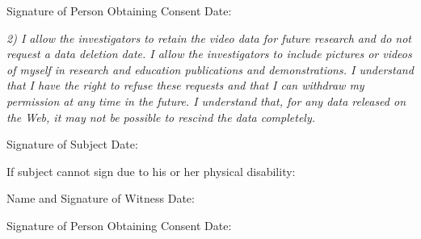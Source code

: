 \begin{letter}
Signature of Person Obtaining Consent \hrulefill  Date: \hrulefill


\vspace{.5cm}



{\em 2) I allow the investigators to retain the video data for future
research and do not request a data deletion date. I allow the
investigators to include pictures or videos of myself in research and
education publications and demonstrations.  I understand that I have
the right to refuse these requests and that I can withdraw my
permission at any time in the future.  I understand that, for any data
released on the Web, it may not be possible to rescind the data
completely.}

Signature of Subject \hrulefill  Date: \hrulefill

If subject cannot sign due to his or her physical disability:

Name and Signature of Witness \hrulefill  Date: \hrulefill

Signature of Person Obtaining Consent \hrulefill  Date: \hrulefill



\end{letter}

 